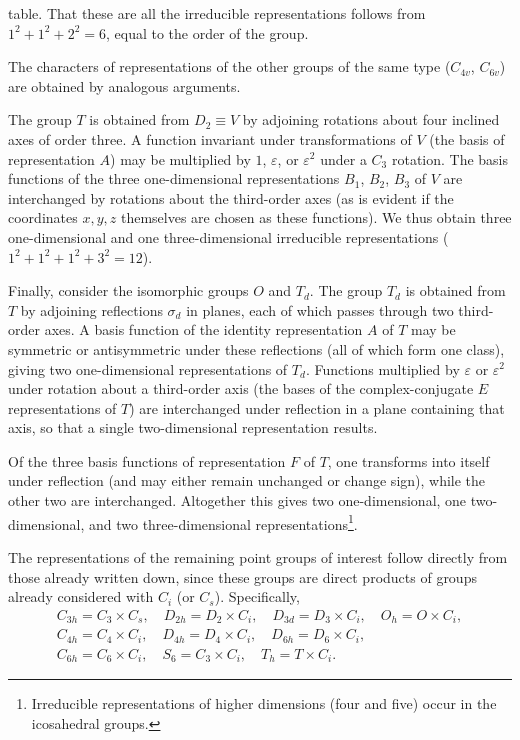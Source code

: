 table. That these are all the irreducible representations follows from $1^2+1^2+2^2=6$, equal to the order of the group.

The characters of representations of the other groups of the same type ($C_{4v}$, $C_{6v}$) are obtained by analogous arguments.

The group $T$ is obtained from $D_2\equiv V$ by adjoining rotations about four inclined axes of order three. A function invariant under transformations of $V$ (the basis of representation $A$) may be multiplied by $1$, $\varepsilon$, or $\varepsilon^2$ under a $C_3$ rotation. The basis functions of the three one-dimensional representations $B_1$, $B_2$, $B_3$ of $V$ are interchanged by rotations about the third-order axes (as is evident if the coordinates $x,y,z$ themselves are chosen as these functions). We thus obtain three one-dimensional and one three-dimensional irreducible representations ($1^2+1^2+1^2+3^2=12$).

Finally, consider the isomorphic groups $O$ and $T_d$. The group $T_d$ is obtained from $T$ by adjoining reflections $\sigma_d$ in planes, each of which passes through two third-order axes. A basis function of the identity representation $A$ of $T$ may be symmetric or antisymmetric under these reflections (all of which form one class), giving two one-dimensional representations of $T_d$. Functions multiplied by $\varepsilon$ or $\varepsilon^2$ under rotation about a third-order axis (the bases of the complex-conjugate $E$ representations of $T$) are interchanged under reflection in a plane containing that axis, so that a single two-dimensional representation results.

Of the three basis functions of representation $F$ of $T$, one transforms into itself under reflection (and may either remain unchanged or change sign), while the other two are interchanged. Altogether this gives two one-dimensional, one two-dimensional, and two three-dimensional representations\footnote{Irreducible representations of higher dimensions (four and five) occur in the icosahedral groups.}.

The representations of the remaining point groups of interest follow directly from those already written down, since these groups are direct products of groups already considered with $C_i$ (or $C_s$). Specifically,
\[
\begin{gathered}
C_{3h}=C_3\times C_s,\quad D_{2h}=D_2\times C_i,\quad D_{3d}=D_3\times C_i,\quad O_h=O\times C_i,\\
C_{4h}=C_4\times C_i,\quad D_{4h}=D_4\times C_i,\quad D_{6h}=D_6\times C_i,\\
C_{6h}=C_6\times C_i,\quad S_6=C_3\times C_i,\quad T_h=T\times C_i.
\end{gathered}
\]

